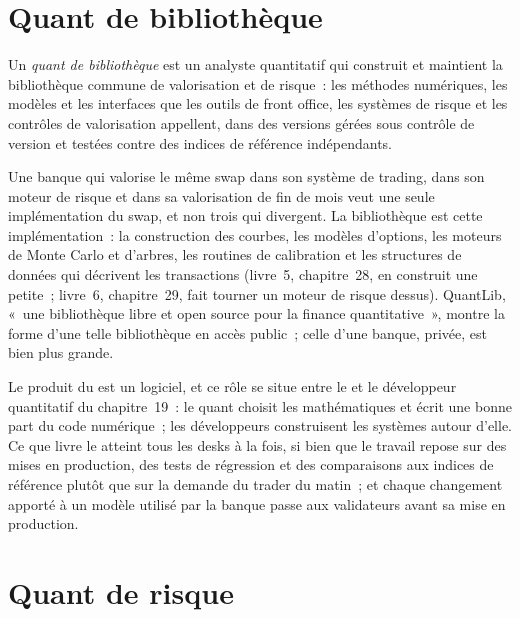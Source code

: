 \section{Quant de bibliothèque}

\begin{definition}\label{def:in:bank-quant:library}
Un \emph{quant de bibliothèque} est un analyste quantitatif qui construit et maintient la bibliothèque commune de valorisation et
de risque~: les méthodes numériques, les modèles et les interfaces que les outils de front office, les systèmes de risque et les contrôles de valorisation
appellent, dans des versions gérées sous contrôle de version et testées contre des indices de référence indépendants.
\end{definition}

Une banque qui valorise le même swap dans son système de trading, dans son moteur de risque et dans sa valorisation de fin de mois veut une seule
implémentation du swap, et non trois qui divergent. La bibliothèque est cette implémentation~: la construction des courbes, les modèles
d'options, les moteurs de Monte Carlo et d'arbres, les routines de calibration et les structures de données qui décrivent les transactions (livre~5,
chapitre~28, en construit une petite~; livre~6, chapitre~29, fait tourner un moteur de risque dessus). QuantLib, «~une bibliothèque libre et open source
pour la finance quantitative~», montre la forme d'une telle bibliothèque en accès public~; celle d'une banque, privée, est bien plus grande.

Le produit du  est un logiciel, et ce rôle se situe entre le  et le développeur quantitatif du
chapitre~19~: le quant choisit les mathématiques et écrit une bonne part du code numérique~; les développeurs construisent les systèmes autour
d'elle. Ce que livre le  atteint tous les desks à la fois, si bien que le travail repose sur des mises en production, des tests de régression et
des comparaisons aux indices de référence plutôt que sur la demande du trader du matin~; et chaque changement apporté à un modèle utilisé par la banque passe
aux validateurs avant sa mise en production.

\section{Quant de risque}

